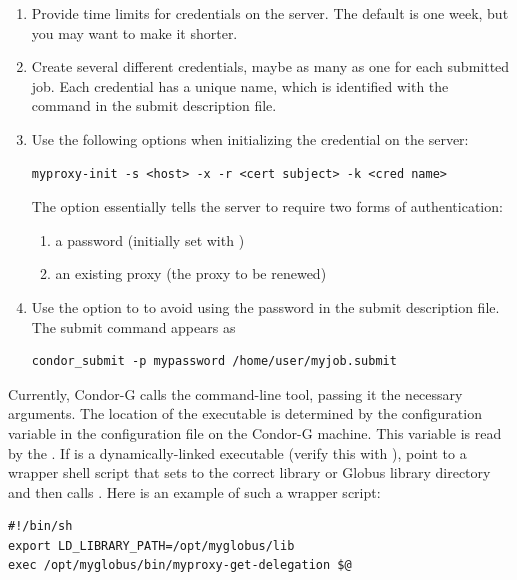 \begin{enumerate}

\item{Provide time limits}
for credentials on the  server.
The default is one week, but you may want to make it shorter.

\item{Create several different  credentials},
maybe as many as one for each submitted job.
Each credential has a unique name,
which is identified with the
 command in the submit description file.

\item{Use the following options}
when initializing the credential on the  server:

\footnotesize
\begin{verbatim}
myproxy-init -s <host> -x -r <cert subject> -k <cred name>
\end{verbatim}
\normalsize

The option 
essentially tells the  server to require two forms
of authentication:
  \begin{enumerate}
  \item{a password (initially set with )}
  \item{an existing proxy (the proxy to be renewed)}
  \end{enumerate}

\item{Use the  option to }
to avoid using the password in the submit description file.
The submit command appears as
\footnotesize
\begin{verbatim}
condor_submit -p mypassword /home/user/myjob.submit
\end{verbatim}
\normalsize

\end{enumerate}

Currently, Condor-G calls the
 command-line tool,
passing it the necessary arguments.
The location of the
 executable is determined by the
configuration variable
 in the configuration file
on the Condor-G machine.
This variable is read by the .
If
is a dynamically-linked executable
(verify this with ),
point
to a wrapper shell script that sets
 to the correct 
library or Globus library directory and then
calls .
Here is an example of such a wrapper script:

\footnotesize
\begin{verbatim}
#!/bin/sh
export LD_LIBRARY_PATH=/opt/myglobus/lib
exec /opt/myglobus/bin/myproxy-get-delegation $@
\end{verbatim}
\normalsize

